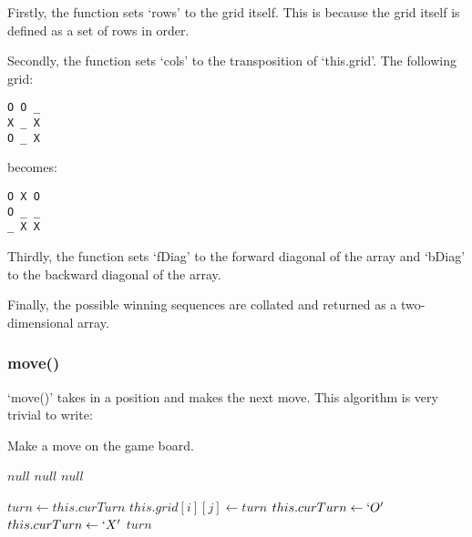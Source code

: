 \documentclass{article}
\begin{document}
Firstly, the function sets `rows' to the grid itself. This is because the grid itself is defined as a set of rows in order.

Secondly, the function sets `cols' to the transposition of `this.grid'. The following grid:

\begin{verbatim}
O O _
X _ X
O _ X
\end{verbatim}

becomes:

\begin{verbatim}
O X O
O _ _
_ X X
\end{verbatim}

Thirdly, the function sets `fDiag' to the forward diagonal of the array and `bDiag' to the backward diagonal of the array.

Finally, the possible winning sequences are collated and returned as a two-dimensional array.

\subsubsection{move()}

`move()' takes in a position and makes the next move. This algorithm is very trivial to write:

\begin{algorithm}
\caption{Make a move on the game board.}

\begin{algorithmic}[1]
    \Return $null$
    \Return $null$
    \Return $null$
  \EndIf

  \State $turn \gets this.curTurn$
  \State $this.grid[i][j] \gets turn$
    \State $this.curTurn \gets `O'$
    \State $this.curTurn \gets `X'$
  \EndIf
  \Return $turn$
\EndProcedure
\end{algorithmic}
\end{algorithm}
\end{document}

